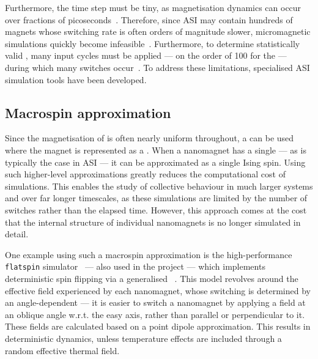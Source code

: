 Furthermore, the time step must be tiny, as magnetisation dynamics can occur over fractions of picoseconds~\cite{PhD_Leliaert}.
Therefore, since ASI may contain hundreds of magnets whose switching rate is often orders of magnitude slower, micromagnetic simulations quickly become infeasible~\cite{leo2021chiral}.
Furthermore, to determine statistically valid , many input cycles must be applied --- on the order of 100 for the  --- during which many switches occur~\cite{RC_TaskAgnosticMetrics_v2}.
To address these limitations, specialised ASI simulation tools have been developed.

\subsection{Macrospin approximation}\label{sec:1:Modelling_macrospin}
Since the magnetisation of  is often nearly uniform throughout, a  can be used where the magnet is represented as a .
When a nanomagnet has a single  --- as is typically the case in ASI --- it can be approximated as a single Ising spin.
Using such higher-level approximations greatly reduces the computational cost of simulations.
This enables the study of collective behaviour in much larger systems and over far longer timescales, as these simulations are limited by the number of switches rather than the elapsed time.
However, this approach comes at the cost that the internal  structure of individual nanomagnets is no longer simulated in detail. \par
One example using such a macrospin approximation is the high-performance \texttt{flatspin} simulator~\cite{flatspin} --- also used in the \spinengine project --- which implements deterministic spin flipping via a generalised ~\cite{StonerWohlfarth2008}.
This model revolves around the effective field experienced by each nanomagnet, whose switching is determined by an angle-dependent  --- it is easier to switch a nanomagnet by applying a field at an oblique angle w.r.t. the easy axis, rather than parallel or perpendicular to it.
These fields are calculated based on a point dipole approximation.
This results in deterministic dynamics, unless temperature effects are included through a random effective thermal field. \par
